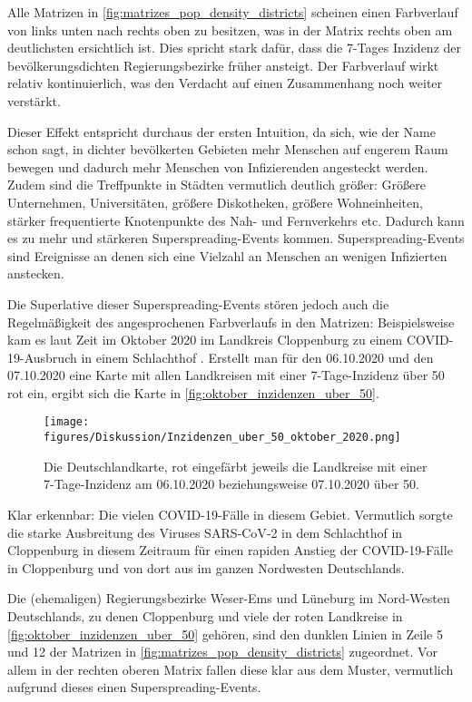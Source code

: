 Alle Matrizen in \autoref{fig:matrizes_pop_density_districts} scheinen einen Farbverlauf von links unten nach rechts oben zu besitzen, was in der Matrix rechts oben am deutlichsten ersichtlich ist. Dies spricht stark dafür, dass die 7-Tages Inzidenz der bevölkerungsdichten Regierungsbezirke früher ansteigt. Der Farbverlauf wirkt relativ kontinuierlich, was den Verdacht auf einen Zusammenhang noch weiter verstärkt.

Dieser Effekt entspricht durchaus der ersten Intuition, da sich, wie der Name schon sagt, in dichter bevölkerten Gebieten mehr Menschen auf engerem Raum bewegen und dadurch mehr Menschen von Infizierenden angesteckt werden.
Zudem sind die Treffpunkte in Städten vermutlich deutlich größer: Größere Unternehmen, Universitäten, größere Diskotheken, größere Wohneinheiten, stärker frequentierte Knotenpunkte des Nah- und Fernverkehrs etc. Dadurch kann es zu mehr und stärkeren Superspreading-Events kommen. Superspreading-Events sind Ereignisse an denen sich eine Vielzahl an Menschen an wenigen Infizierten anstecken.

Die Superlative dieser Superspreading-Events stören jedoch auch die Regelmäßigkeit des angesprochenen Farbverlaufs in den Matrizen: Beispielsweise kam es laut Zeit im Oktober 2020 im Landkreis Cloppenburg zu einem COVID-19-Ausbruch in einem Schlachthof \autocite{Zeitartikel}. Erstellt man für den 06.10.2020 und den 07.10.2020 eine Karte mit allen Landkreisen mit einer 7-Tage-Inzidenz über 50 rot ein, ergibt sich die Karte in \autoref{fig:oktober_inzidenzen_uber_50}.

\begin{figure}[H]
    \centering
    \texttt{[image: figures/Diskussion/Inzidenzen\_uber\_50\_oktober\_2020.png]}
    \caption{Die Deutschlandkarte, rot eingefärbt jeweils die Landkreise mit einer 7-Tage-Inzidenz am 06.10.2020 beziehungsweise 07.10.2020 über 50.}
    \label{fig:oktober_inzidenzen_uber_50}
\end{figure}
Klar erkennbar: Die vielen COVID-19-Fälle in diesem Gebiet. Vermutlich sorgte die starke Ausbreitung des Viruses SARS‑CoV‑2 in dem Schlachthof in Cloppenburg in diesem Zeitraum für einen rapiden Anstieg der COVID-19-Fälle in Cloppenburg und von dort aus im ganzen Nordwesten Deutschlands.

Die (ehemaligen) Regierungsbezirke Weser-Ems und Lüneburg im Nord-Westen Deutschlands, zu denen Cloppenburg und viele der roten Landkreise in \autoref{fig:oktober_inzidenzen_uber_50} gehören, sind den dunklen Linien in Zeile 5 und 12 der Matrizen in \autoref{fig:matrizes_pop_density_districts} zugeordnet. Vor allem in der rechten oberen Matrix fallen diese klar aus dem Muster, vermutlich aufgrund dieses einen Superspreading-Events.

